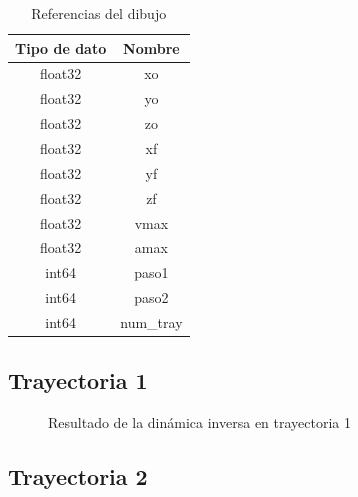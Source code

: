             \begingroup
            \renewcommand{\arraystretch}{1.0}
            \begin{table}[H]
                \centering
                \begin{tabular}{c c}
                   \hline                   
                   \textbf{Tipo de dato}  & \textbf{Nombre}    \\\hline \hline 
                    float32 & xo
                   \\\hline
                    float32 & yo
                   \\\hline
                    float32 & zo
                   \\\hline
                    float32 & xf
                   \\\hline
                    float32 & yf
                   \\\hline
                    float32 & zf
                   \\\hline
                    float32 & vmax
                   \\\hline
                    float32 & amax
                   \\\hline
                    int64 & paso1
                   \\\hline
                    int64 & paso2
                   \\\hline
                    int64 & num\_tray
                    \\\hline                   
                \end{tabular}
                \caption{Referencias del dibujo}
                \label{tab:cap6_rviz_5_msg}
            \end{table}
        \endgroup   
        \newpage

    \subsection{Trayectoria 1}
    
        \begin{figure}[h]
            \centering
            
            \caption{Resultado de la dinámica inversa en trayectoria 1}
            \label{f:cap7_tray1}
        \end{figure}

                
    \subsection{Trayectoria 2}
    
